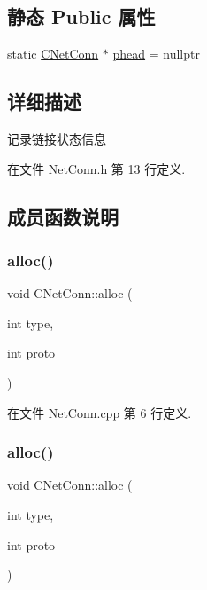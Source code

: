 \subsection*{静态 Public 属性}
\begin{DoxyCompactItemize}
\item 
static \hyperlink{class_c_net_conn}{C\+Net\+Conn} $\ast$ \hyperlink{class_c_net_conn_a4d52e492a5ac410d6bf6bb0c7d2df5a9}{phead} = nullptr
\end{DoxyCompactItemize}


\subsection{详细描述}
记录链接状态信息 

在文件 Net\+Conn.\+h 第 13 行定义.



\subsection{成员函数说明}
\mbox{\label{class_c_net_conn_acbae5bdb550ed916cfaedf6ec0caa8de}} 
\subsubsection{\texorpdfstring{alloc()}{alloc()}\hspace{0.1cm}{\footnotesize\ttfamily [1/2]}}
{\footnotesize\ttfamily void C\+Net\+Conn\+::alloc (\begin{DoxyParamCaption}\item[{int}]{type,  }\item[{int}]{proto }\end{DoxyParamCaption})}



在文件 Net\+Conn.\+cpp 第 6 行定义.

\mbox{\label{class_c_net_conn_acbae5bdb550ed916cfaedf6ec0caa8de}} 
\subsubsection{\texorpdfstring{alloc()}{alloc()}\hspace{0.1cm}{\footnotesize\ttfamily [2/2]}}
{\footnotesize\ttfamily void C\+Net\+Conn\+::alloc (\begin{DoxyParamCaption}\item[{int}]{type,  }\item[{int}]{proto }\end{DoxyParamCaption})}

